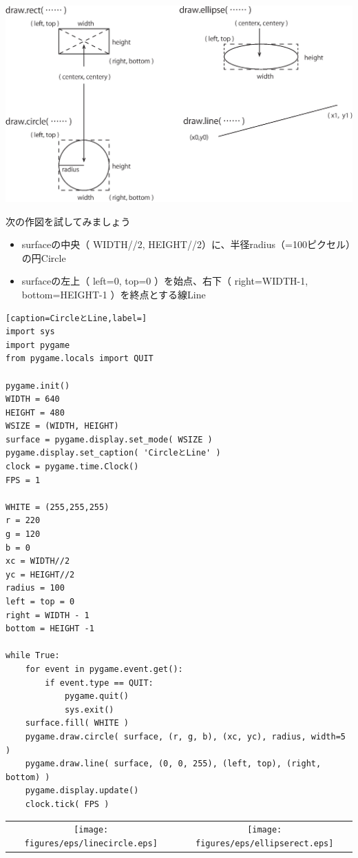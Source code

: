 \documentclass[uplatex,a4paper,11pt,oneside,openany]{jsbook}
\begin{document}
\begin{center}
\includegraphics[width=0.6\hsize]{figures/eps/pg03.eps}
\end{center}


次の作図を試してみましょう
\begin{itemize}
\item surfaceの中央（ WIDTH//2, HEIGHT//2）に、半径radius（=100ピクセル）の円Circle
\item surfaceの左上（ left=0, top=0 ）を始点、右下（ right=WIDTH-1, bottom=HEIGHT-1 ）を終点とする線Line
\end{itemize}

\begin{lstlisting}[caption=CircleとLine,label=]
import sys
import pygame
from pygame.locals import QUIT

pygame.init()
WIDTH = 640
HEIGHT = 480
WSIZE = (WIDTH, HEIGHT)
surface = pygame.display.set_mode( WSIZE )
pygame.display.set_caption( 'CircleとLine' )
clock = pygame.time.Clock()
FPS = 1

WHITE = (255,255,255)
r = 220
g = 120
b = 0
xc = WIDTH//2
yc = HEIGHT//2
radius = 100
left = top = 0
right = WIDTH - 1
bottom = HEIGHT -1

while True:
    for event in pygame.event.get():
        if event.type == QUIT:
            pygame.quit()
            sys.exit()
    surface.fill( WHITE )
    pygame.draw.circle( surface, (r, g, b), (xc, yc), radius, width=5 )
    pygame.draw.line( surface, (0, 0, 255), (left, top), (right, bottom) )
    pygame.display.update()
    clock.tick( FPS )
\end{lstlisting}

\begin{table}[htb]
\begin{center}
    \begin{tabular}{cc}
    \texttt{[image: figures/eps/linecircle.eps]} & \texttt{[image: figures/eps/ellipserect.eps]}
  \end{tabular}
\end{center}
\end{table}
\end{document}
